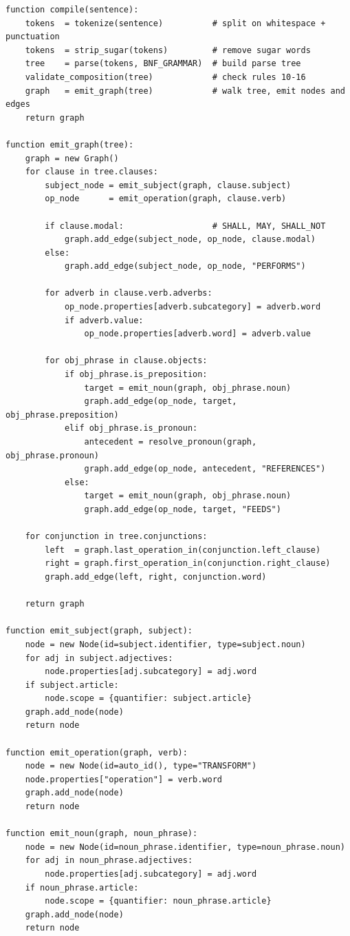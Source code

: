 \documentclass{article}
\begin{document}
\begin{lstlisting}[style=pseudocode]
function compile(sentence):
    tokens  = tokenize(sentence)          # split on whitespace + punctuation
    tokens  = strip_sugar(tokens)         # remove sugar words
    tree    = parse(tokens, BNF_GRAMMAR)  # build parse tree
    validate_composition(tree)            # check rules 10-16
    graph   = emit_graph(tree)            # walk tree, emit nodes and edges
    return graph

function emit_graph(tree):
    graph = new Graph()
    for clause in tree.clauses:
        subject_node = emit_subject(graph, clause.subject)
        op_node      = emit_operation(graph, clause.verb)

        if clause.modal:                  # SHALL, MAY, SHALL_NOT
            graph.add_edge(subject_node, op_node, clause.modal)
        else:
            graph.add_edge(subject_node, op_node, "PERFORMS")

        for adverb in clause.verb.adverbs:
            op_node.properties[adverb.subcategory] = adverb.word
            if adverb.value:
                op_node.properties[adverb.word] = adverb.value

        for obj_phrase in clause.objects:
            if obj_phrase.is_preposition:
                target = emit_noun(graph, obj_phrase.noun)
                graph.add_edge(op_node, target, obj_phrase.preposition)
            elif obj_phrase.is_pronoun:
                antecedent = resolve_pronoun(graph, obj_phrase.pronoun)
                graph.add_edge(op_node, antecedent, "REFERENCES")
            else:
                target = emit_noun(graph, obj_phrase.noun)
                graph.add_edge(op_node, target, "FEEDS")

    for conjunction in tree.conjunctions:
        left  = graph.last_operation_in(conjunction.left_clause)
        right = graph.first_operation_in(conjunction.right_clause)
        graph.add_edge(left, right, conjunction.word)

    return graph

function emit_subject(graph, subject):
    node = new Node(id=subject.identifier, type=subject.noun)
    for adj in subject.adjectives:
        node.properties[adj.subcategory] = adj.word
    if subject.article:
        node.scope = {quantifier: subject.article}
    graph.add_node(node)
    return node

function emit_operation(graph, verb):
    node = new Node(id=auto_id(), type="TRANSFORM")
    node.properties["operation"] = verb.word
    graph.add_node(node)
    return node

function emit_noun(graph, noun_phrase):
    node = new Node(id=noun_phrase.identifier, type=noun_phrase.noun)
    for adj in noun_phrase.adjectives:
        node.properties[adj.subcategory] = adj.word
    if noun_phrase.article:
        node.scope = {quantifier: noun_phrase.article}
    graph.add_node(node)
    return node
\end{lstlisting}
\end{document}
